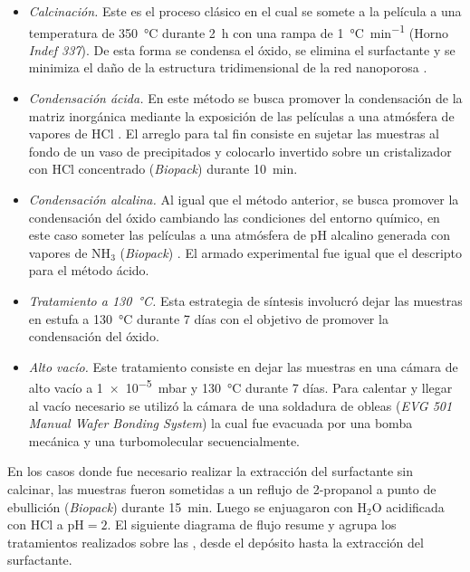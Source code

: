 				\begin{itemize}

				\item \textit{Calcinación.} Este es el proceso clásico en el cual se somete a la película a una temperatura de \SI{350}{\celsius} durante \SI{2}{\hour} con una rampa de \SI{1}{\celsius.\minute^{-1}} (Horno \textit{Indef 337}). De esta forma se condensa el óxido, se elimina el surfactante y se minimiza el daño de la estructura tridimensional de la red nanoporosa \cite{Crepaldi2003}.

				\item \textit{Condensación ácida.} En este método se busca promover la condensación de la matriz inorgánica mediante la exposición de las películas a una atmósfera de vapores de HCl \cite{Doshi2000a}. El arreglo para tal fin consiste en sujetar las muestras al fondo de un vaso de precipitados y colocarlo invertido sobre un cristalizador con HCl concentrado (\textit{Biopack}) durante \SI{10}{\minute}. 

				\item \textit{Condensación alcalina.} Al igual que el método anterior, se busca promover la condensación del óxido cambiando las condiciones del entorno químico, en este caso someter las películas a una atmósfera de pH alcalino generada con vapores de NH$_3$ (\textit{Biopack}) \cite{Soler-Illia2012,Soler-Illia2011}. El armado experimental fue igual que el descripto para el método ácido.

				\item \textit{Tratamiento a \SI{130}{\celsius}.} Esta estrategia de síntesis involucró dejar las muestras en estufa a \SI{130}{\celsius} durante 7 días con el objetivo de promover la condensación del óxido.

				\item \textit{Alto vacío.} Este tratamiento consiste en dejar las muestras en una cámara de alto vacío a \SI{1e-5}{\milli\bar} y \SI{130}{\celsius} durante 7 días. Para calentar y llegar al vacío necesario se utilizó la cámara de una soldadura de obleas (\textit{EVG 501 Manual Wafer Bonding System}) la cual fue evacuada por una bomba mecánica y una turbomolecular secuencialmente.

				\end{itemize}
					
		En los casos donde fue necesario realizar la extracción del surfactante sin calcinar, las muestras fueron sometidas a un reflujo de 2-propanol a punto de ebullición (\textit{Biopack}) durante \SI{15}{\minute}. Luego se enjuagaron con H$_2$O acidificada con HCl a $\text{pH}=2$. El siguiente diagrama de flujo resume y agrupa los tratamientos realizados sobre las \pdm, desde el depósito hasta la extracción del surfactante.
		
